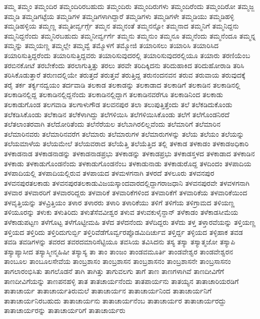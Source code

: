 {ತಮ್ಮ
ತಮ್ಮಂ
ತಮ್ಮಂದಿರ
ತಮ್ಮಂದಿರಿರಬಹುದು
ತಮ್ಮಂದಿರು
ತಮ್ಮಂದಿರುಗಳು
ತಮ್ಮಂದಿರೆಂದು
ತಮ್ಮಂದಿರೋ
ತಮ್ಮಜ್ಜ
ತಮ್ಮಡಿ
ತಮ್ಮಡಿಗಟ್ಟೆಯ
ತಮ್ಮಡಿಗಳ
ತಮ್ಮಡಿಗಳಾಗಿದ್ದಾರೆ
ತಮ್ಮಡಿಗಳು
ತಮ್ಮಡಿಗಳೇ
ತಮ್ಮಡಿಯು
ತಮ್ಮಡಿಹಳ್ಳಿ
ತಮ್ಮಡಿಹಳ್ಳಿಯ
ತಮ್ಮಣ್ಣ
ತಮ್ಮತೀರ್ವ್ವರ್ಗ್ಗೆ
ತಮ್ಮನ
ತಮ್ಮನಂತೆ
ತಮ್ಮನನ್ನೋ
ತಮ್ಮನಾದ
ತಮ್ಮನಿಗೆ
ತಮ್ಮನಿದ್ದನು
ತಮ್ಮನಿದ್ದನೆಂದು
ತಮ್ಮನಿರಬಹುದು
ತಮ್ಮನೀರ್ವ್ವರ್ಗೆ
ತಮ್ಮನು
ತಮ್ಮನುಂ
ತಮ್ಮನೂ
ತಮ್ಮನೆಂದು
ತಮ್ಮನೆಂದೂ
ತಮ್ಮನ್ನ
ತಮ್ಮನ್ನು
ತಮ್ಮಯಣ್ಣ
ತಮ್ಮಲ್ಲೇ
ತಮ್ಮವ್ವೆ
ತಮ್ಮೊಳಗೆ
ತಮ್ಮೋಜಿ
ತಯಾರಿಸಲು
ತಯಾರಿಸಿ
ತಯಾರಿಸಿದ
ತಯಾರಿಸುತ್ತಿದ್ದರೆಂದು
ತಯಾರಿಸುತ್ತಿದ್ದವರು
ತಯಾರಿಸುವುದರಲ್ಲಿ
ತಯಾರಿಸುವುದರಲ್ಲಿಯೂ
ತಯಾರು
ತರಣಿಯೆಂಬ
ತರಬಿನಕೋಟೆ
ತರಬೇಕೆಂದು
ತರಲಾಗುತ್ತಿತ್ತು
ತರಲು
ತರವೇ
ತರಿದಿಕ್ಕಿದನು
ತರಿದುಹಾಕಿದ
ತರಿದುಹೋರಾಡಿ
ತರಿಸಿ
ತರಿಸಿಕೊಡುತ್ತಾರೆ
ತರುಣದಲ್ಲಿಯೇ
ತರುತ್ತದೆ
ತರುತ್ತವೆ
ತರುತ್ತಿದ್ದ
ತರುನಂದನವನ
ತರುವ
ತರುವಾಯ
ತರುವುದಕ್ಕೆ
ತರೈ
ತರ್ಕ
ತರ್ಕ್ಯನದ್ವಯಂ
ತರ್ದವಾಡಿ
ತಲಕಾಡ
ತಲಕಾಡನ್ನು
ತಲಕಾಡಾದ
ತಲಕಾಡಿಗೆ
ತಲಕಾಡಿನ
ತಲಕಾಡಿನಲ್ಲಿ
ತಲಕಾಡಿನಲ್ಲಿದ್ದ
ತಲಕಾಡಿನಲ್ಲಿದ್ದನೆಂದು
ತಲಕಾಡಿನಲ್ಲಿದ್ದಾಗ
ತಲಕಾಡಿನವರೆಗೂ
ತಲಕಾಡಿನಿಂದ
ತಲಕಾಡು
ತಲಕಾಡುಗೊಂಡ
ತಲಗವಾಡಿ
ತಲಗಾಳುಗೌಡ
ತಲವನಪುರ
ತಲಾ
ತಲುಪುತ್ತಿತ್ತೆಂದು
ತಲೆ
ತಲೆಕಡಿದುಕೊಂಡು
ತಲೆಕಡಿಸಿಕೊಂಡು
ತಲೆಕಾಡಿನ
ತಲೆಕೆಳಾಗಿದ್ದು
ತಲೆಗಳಿಯಿಸಿ
ತಲೆಗಳಿಯಿಸಿಕೊಂಡು
ತಲೆಗೆ
ತಲೆಗೊಂಡನಿರದೆ
ತಲೆತಲಾಂತರವಾಗಿ
ತಲೆದೋರಿತೆಂದು
ತಲೆನೆರೆಯಲ
ತಲೆಬಾಗಿರಲಿಲ್ಲವೆಂದು
ತಲೆಮಾರಿಗೆ
ತಲೆಮಾರಿನ
ತಲೆಮಾರಿನವರು
ತಲೆಮಾರಿನವರೆಗ
ತಲೆಮಾರು
ತಲೆಮಾರುಗಳ
ತಲೆಮಾರುಗಳನ್ನು
ತಲೆಯ
ತಲೆಯಂ
ತಲೆಯನ್ನು
ತಲೆಯಮಾಳೆಯ
ತಲೆಯಮೇಲೆ
ತಲೆಯವರಾದ
ತಲೆಯೆತ್ತಿ
ತಲೆಯೆತ್ತಿದ
ತಲ್ಲಿ
ತಳಕಾಡ
ತಳಕಾಡಂ
ತಳಕಾಡಅಧಿಕಾರಿ
ತಳಕಾಡನಾಡ
ತಳಕಾಡನಾಡನ್ನು
ತಳಕಾಡನಾಡಪ್ರಭು
ತಳಕಾಡನ್ನು
ತಳಕಾಡಪ್ರಭು
ತಳಕಾಡಸ್ತಳದ
ತಳಕಾಡಾದ
ತಳಕಾಡಿನ
ತಳಕಾಡು
ತಳಕಾಡುಗೊಂಡನೆಂದು
ತಳಕಾಡುಗೊಂಡನೆಂಬ
ತಳಕಾಡುನಾಡು
ತಳಕಾಡುರೊದ್ದ
ತಳದಿಂದಂ
ತಳಪಾದಿಯ
ತಳಪಾದಿಯಲ್ಲಿ
ತಳಪಾದಿಯಲ್ಲಿರುವ
ತಳಪಾಯದ
ತಳಮಳಗನಾಗಿ
ತಳರದೆ
ತಳಲೂರು
ತಳವನಪುರ
ತಳವನಪುರತಲಕಾಡು
ತಳವನಪುರತಲಕಾಡುವಿಜಯಸ್ಕಾಂದವಾರದಲ್ಲಿದ್ದಾಗರಾಜಧಾನಿ
ತಳವನಪುರವೇ
ತಳವಳಗನಾಗಿ
ತಳವಾರ
ತಳವಾರರಿಗೆ
ತಳವಾರರಿದ್ದರು
ತಳವಾರಿಕೆ
ತಳವಾರಿಕೆಗಳಿಂದ
ತಳವಾರಿಕೆಗೆ
ತಳವಾರಿಕೆಯ
ತಳವಾರಿಕೆಯಿಂದ
ತಳವೃತ್ತಿಯನ್ನು
ತಳವ್ರಿತ್ತಿಯಂ
ತಳಾರ
ತಳಾರರು
ತಳಾರಿ
ತಳಾರಿಕೆಯು
ತಳಿಗೆ
ತಳಿಗೆಯ
ತಳಿಗ್ರಾಮದ
ತಳಿಯಣ್ಣ
ತಳಿಯೂರನ್ನು
ತಳುಕು
ತಳುತಿರಿದು
ತಳುತೆಸೆವವೀಶ್ವರ
ತಳುವ
ತಳುವಕುಳೈನ್ದಾನ್
ತಳೆಕಾಡಂ
ತಳೆಕಾಡಸೀಮೆಯ
ತಳೆಕಾಡುಪಟ್ಟಣ
ತಳೆಗೊಟ್ಟ
ತಳೆಗೊಟ್ಟೀಮಹಿ
ತಳೆದ
ತಳೆದನೆಂದು
ತಳೆದಿದ್ದರು
ತಳೆದು
ತಳ್ತ
ತಳ್ತಾರವೆಯನ್ನು
ತಳ್ತಿಯಣ್ಣ
ತಳ್ತಿಯದ
ತಳ್ತಿರಿದು
ತಳ್ತಿರಿದುಗುರ್ಬ್ಬಿ
ತಳ್ತಿರಿವೆಡೆಗೊರ್ವ್ವರಪ್ಪೊಡಮಿದಿರ್ಚುವ
ತಳ್ತಿರ್ದ್ದ
ತಳ್ಳಿಯದ
ತಳ್ಳಿಹಾಕ
ತವಡ
ತವಡಿ
ತವಡಿಗಳನ್ನು
ತವರದ
ತವರದಮಾರಿಸೆಟ್ಟಿಯೂ
ತವಸಿಯ
ತವಿಸಿದನು
ತಸ್ಯ
ತಸ್ಯಾ
ತಸ್ಯಾತ್ಮಜೋ
ತಸ್ಯಾಪಿ
ತಸ್ಯಾಪ್ಯಾಸೀದ
ತಸ್ಯಾಸ್ಮೀನ್ಮಹಿಷೀ
ತಸ್ಯಾಸ್ಯ
ತಾ
ತಾಂ
ತಾಂಜಂ
ತಾಂಡವಮೂರ್ತಿ
ತಾಂಡವೇಶ್ವರ
ತಾಂಡವೇಶ್ವರನ
ತಾಂಬೂಲ
ತಾಂಬೂಲಸೇವೆಯ
ತಾಂಬ್ರಶಾಸಂ
ತಾಂಬ್ರಶಾಸನ
ತಾಂಬ್ರಶಾಸನಂ
ತಾಂಬ್ರಶಾಸನೇ
ತಾಂಬ್ರಸಾಸನಂ
ತಾಗಲಾರಂಭಿಸಿತು
ತಾಗಲೊಡನೆ
ತಾಗಿ
ತಾಗಿತ್ತು
ತಾಗುವಲಗು
ತಾಗೆ
ತಾಣ
ತಾಣಗಳಾಗಿವೆ
ತಾಣದೀವಿಗೆಗೆ
ತಾಣದೀವಿಗೆಯನ್ನು
ತಾಣಪನಹಳ್ಳಿ
ತಾತ
ತಾತಚಾರ್ಯನೆಂದು
ತಾತಪಾರ್ಯನು
ತಾತಯ್ಯನ
ತಾತಾಚಾರಿಯರಡಿಗೆ
ತಾತಾಚಾರ್ಯ
ತಾತಾಚಾರ್ಯತಿರುಮಲೆ
ತಾತಾಚಾರ್ಯನ
ತಾತಾಚಾರ್ಯನಿಂದ
ತಾತಾಚಾರ್ಯನಿಗೆ
ತಾತಾಚಾರ್ಯನಿರಬಹುದು
ತಾತಾಚಾರ್ಯನು
ತಾತಾಚಾರ್ಯನೆಂಬ
ತಾತಾಚಾರ್ಯರ
ತಾತಾಚಾರ್ಯರದ್ದು
ತಾತಾಚಾರ್ಯರನ್ನು
ತಾತಾಚಾರ್ಯರಿಗೆ
ತಾತಾಚಾರ್ಯರು
}
